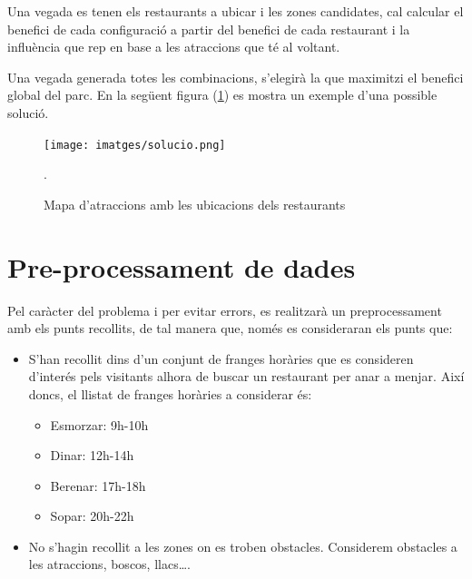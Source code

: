 \documentclass[12pt]{article}
\begin{document}
Una vegada es tenen els restaurants a ubicar i les zones candidates, cal calcular el benefici de cada configuració a partir del benefici de cada restaurant i la influència que rep en base a les atraccions que té al voltant.  

Una vegada generada totes les combinacions, s'elegirà la que maximitzi el benefici global del parc. En la següent figura (\ref{fig:mapa_restaurants}) es mostra un exemple d'una possible solució.

\begin{figure}[H]
	\centering
	\texttt{[image: imatges/solucio.png]}\par\vspace{1cm}
	\caption{Mapa d'atraccions amb les ubicacions dels restaurants}.
	\label{fig:mapa_restaurants}
\end{figure}


\section{Pre-processament de dades}
Pel caràcter del problema i per evitar errors, es realitzarà un preprocessament amb els punts recollits, de tal manera que, només es consideraran els punts que:
\begin{itemize}
	\item S’han recollit dins d’un conjunt de franges horàries que es consideren d'interés pels visitants alhora de buscar un restaurant per anar a menjar. 
	Així doncs, el llistat de franges horàries a considerar és:
	\begin{itemize}
		\item Esmorzar: 9h-10h
		\item Dinar: 12h-14h
		\item Berenar: 17h-18h
		\item Sopar: 20h-22h
	\end{itemize}

	\item No s’hagin recollit a les zones on es troben obstacles. 
	Considerem obstacles a les atraccions, boscos, llacs….
\end{itemize}



\end{document}
